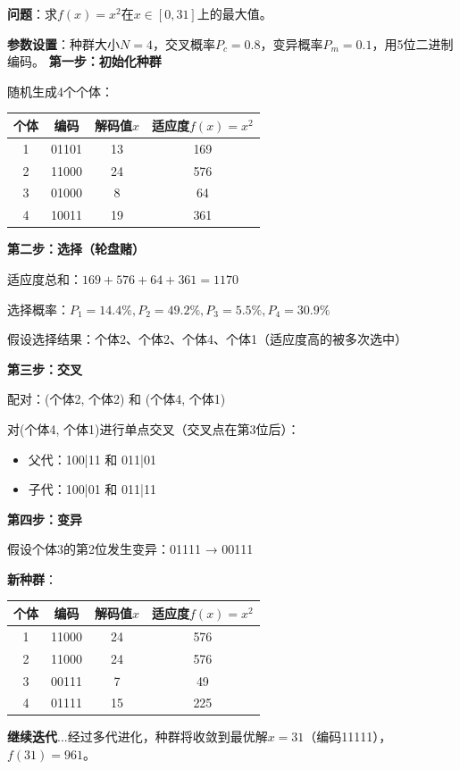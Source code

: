 \begin{examplebox}[例题4.1 用遗传算法求函数最大值]
\textbf{问题}：求$f(x) = x^2$在$x \in [0, 31]$上的最大值。

\textbf{参数设置}：种群大小$N=4$，交叉概率$P_c=0.8$，变异概率$P_m=0.1$，用5位二进制编码。
\tcblower
\textbf{第一步：初始化种群}

随机生成4个个体：
\begin{center}
\begin{tabular}{cccc}
\toprule
个体 & 编码 & 解码值$x$ & 适应度$f(x)=x^2$ \\
\midrule
1 & 01101 & 13 & 169 \\
2 & 11000 & 24 & 576 \\
3 & 01000 & 8 & 64 \\
4 & 10011 & 19 & 361 \\
\bottomrule
\end{tabular}
\end{center}

\textbf{第二步：选择（轮盘赌）}

适应度总和：$169+576+64+361=1170$

选择概率：$P_1=14.4\%, P_2=49.2\%, P_3=5.5\%, P_4=30.9\%$

假设选择结果：个体2、个体2、个体4、个体1（适应度高的被多次选中）

\textbf{第三步：交叉}

配对：(个体2, 个体2) 和 (个体4, 个体1)

对(个体4, 个体1)进行单点交叉（交叉点在第3位后）：
\begin{itemize}[itemsep=0pt]
    \item 父代：100|11 和 011|01
    \item 子代：100|01 和 011|11
\end{itemize}

\textbf{第四步：变异}

假设个体3的第2位发生变异：01111 → 00111

\textbf{新种群}：
\begin{center}
\begin{tabular}{cccc}
\toprule
个体 & 编码 & 解码值$x$ & 适应度$f(x)=x^2$ \\
\midrule
1 & 11000 & 24 & 576 \\
2 & 11000 & 24 & 576 \\
3 & 00111 & 7 & 49 \\
4 & 01111 & 15 & 225 \\
\bottomrule
\end{tabular}
\end{center}

\textbf{继续迭代}...经过多代进化，种群将收敛到最优解$x=31$（编码11111），$f(31)=961$。
\end{examplebox}

